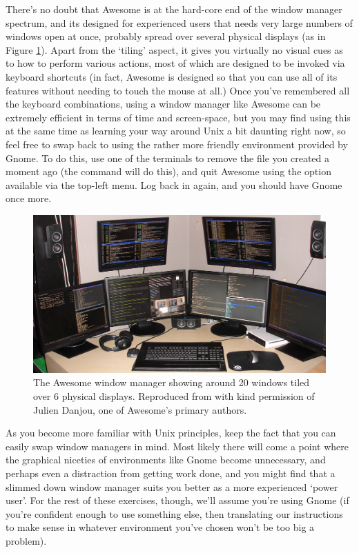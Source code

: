 There's no doubt that Awesome is at the hard-core end of the window manager spectrum, and its designed for experienced users that needs very large numbers of windows open at once, probably spread over several physical displays (as in Figure \ref{figure:awesome}). Apart from the `tiling' aspect, it gives you virtually no visual cues as to how to perform various actions, most of which are designed to be invoked via keyboard shortcuts (in fact, Awesome is designed so that you can use all of its features without needing to touch the mouse at all.) Once you've remembered all the keyboard combinations, using a window manager like Awesome can be extremely efficient in terms of time and screen-space, but you may find using this at the same time as learning your way around Unix a bit daunting right now, so feel free to swap back to using the rather more friendly environment provided by Gnome. To do this, use one of the terminals to remove the  file you created a moment ago (the command  will do this), and quit Awesome using the option available via the top-left menu. Log back in again, and you should have Gnome once more. 

\begin{figure}[htb]
  \begin{center}
    \includegraphics[width=14cm]{images/awesome.png}
  \end{center}
\caption{The Awesome window manager showing around 20 windows tiled over 6 physical displays. Reproduced from  with kind permission of Julien Danjou, one of Awesome's primary authors.}
\label{figure:awesome}
\end{figure}

As you become more familiar with Unix principles, keep the fact that you can easily swap window managers in mind. Most likely there will come a point where the graphical niceties of environments like Gnome become unnecessary, and perhaps even a distraction from getting work done, and you might find that a slimmed down window manager suits you better as a more experienced `power user'. For the rest of these exercises, though, we'll assume you're using Gnome (if you're confident enough to use something else, then translating our instructions to make sense in whatever environment you've chosen won't be too big a problem). 

